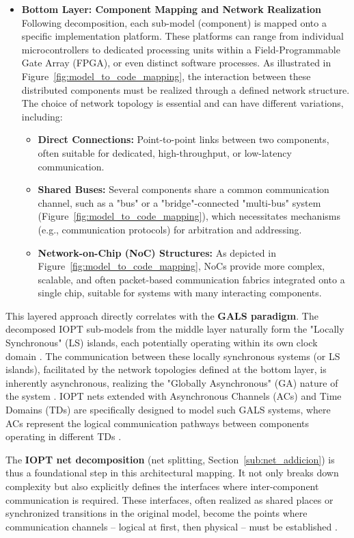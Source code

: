 \begin{itemize}
    \item \textbf{Bottom Layer: Component Mapping and Network Realization} \\
    Following decomposition, each sub-model (component) is mapped onto a specific implementation platform. These platforms can range from individual microcontrollers to dedicated processing units within a Field-Programmable Gate Array (FPGA), or even distinct software processes. As illustrated in Figure~\ref{fig:model_to_code_mapping}, the interaction between these distributed components must be realized through a defined network structure. The choice of network topology is essential and can have different variations, including:
    \begin{itemize}
        \item \textbf{Direct Connections:} Point-to-point links between two components, often suitable for dedicated, high-throughput, or low-latency communication.
        \item \textbf{Shared Buses:} Several components share a common communication channel, such as a "bus" or a "bridge"-connected "multi-bus" system (Figure~\ref{fig:model_to_code_mapping}), which necessitates mechanisms (e.g., communication protocols) for arbitration and addressing.
        \item \textbf{Network-on-Chip (NoC) Structures:} As depicted in Figure~\ref{fig:model_to_code_mapping}, NoCs provide more complex, scalable, and often packet-based communication fabrics integrated onto a single chip, suitable for systems with many interacting components.
    \end{itemize}
\end{itemize}

This layered approach directly correlates with the \textbf{GALS paradigm}. The decomposed IOPT sub-models from the middle layer naturally form the "Locally Synchronous" (LS) islands, each potentially operating within its own clock domain \cite{galsactd}. The communication between these locally  synchronous systems (or LS islands), facilitated by the network topologies defined at the bottom layer, is inherently asynchronous, realizing the "Globally Asynchronous" (GA) nature of the system \cite{galsborman}. IOPT nets extended with Asynchronous Channels (ACs) and Time Domains (TDs) are specifically designed to model such GALS systems, where ACs represent the logical communication pathways between components operating in different TDs \cite{galsactd, iopttools}.

The \textbf{IOPT net decomposition} (net splitting, Section~\ref{sub:net_addicion}) is thus a foundational step in this architectural mapping. It not only breaks down complexity but also explicitly defines the interfaces where inter-component communication is required. These interfaces, often realized as shared places or synchronized transitions in the original model, become the points where communication channels – logical at first, then physical – must be established \cite{Barrosadd}.


